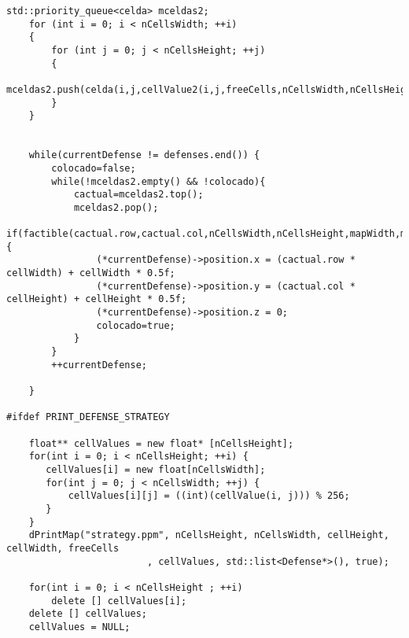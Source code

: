 \begin{lstlisting}
std::priority_queue<celda> mceldas2;
    for (int i = 0; i < nCellsWidth; ++i)
    {
    	for (int j = 0; j < nCellsHeight; ++j)
    	{
    		mceldas2.push(celda(i,j,cellValue2(i,j,freeCells,nCellsWidth,nCellsHeight,mapWidth,mapHeight,obstacles,defenses)));
    	}
    }
    

    while(currentDefense != defenses.end()) {
    	colocado=false;
    	while(!mceldas2.empty() && !colocado){
    		cactual=mceldas2.top();
            mceldas2.pop();
    		if(factible(cactual.row,cactual.col,nCellsWidth,nCellsHeight,mapWidth,mapHeight,obstacles,defenses,currentDefense)){
    			(*currentDefense)->position.x = (cactual.row * cellWidth) + cellWidth * 0.5f;
        		(*currentDefense)->position.y = (cactual.col * cellHeight) + cellHeight * 0.5f;
        		(*currentDefense)->position.z = 0; 
                colocado=true;
    		}
    	}
        ++currentDefense;
    	
    }

#ifdef PRINT_DEFENSE_STRATEGY

    float** cellValues = new float* [nCellsHeight]; 
    for(int i = 0; i < nCellsHeight; ++i) {
       cellValues[i] = new float[nCellsWidth];
       for(int j = 0; j < nCellsWidth; ++j) {
           cellValues[i][j] = ((int)(cellValue(i, j))) % 256;
       }
    }
    dPrintMap("strategy.ppm", nCellsHeight, nCellsWidth, cellHeight, cellWidth, freeCells
                         , cellValues, std::list<Defense*>(), true);

    for(int i = 0; i < nCellsHeight ; ++i)
        delete [] cellValues[i];
	delete [] cellValues;
	cellValues = NULL;

\end{lstlisting}
